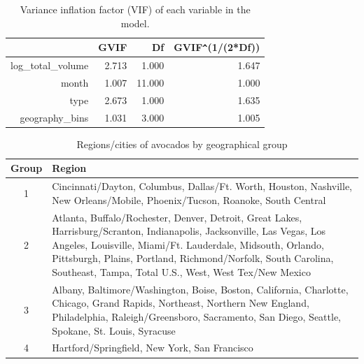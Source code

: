 \documentclass[11pt]{article}\usepackage[]{graphicx}\usepackage[]{color}
\begin{document}
\begin{center}
\begin{table}[ht]
\centering
\begin{tabular}{rrrr}
  \hline
 & GVIF & Df & GVIF\verb|^|(1/(2*Df)) \\ 
  \hline
log\_total\_volume & 2.713 & 1.000 & 1.647 \\ 
  month & 1.007 & 11.000 & 1.000 \\ 
  type & 2.673 & 1.000 & 1.635 \\ 
  geography\_bins & 1.031 & 3.000 & 1.005 \\ 
   \hline
\end{tabular}
\caption{Variance inflation factor (VIF) of each variable in the model.} 
\label{vif_table}
\end{table}

\end{center} 
\hfill \break


\begin{center}
\begin{table}[ht]
\centering
\begin{tabular}{cp{5in}}
  \hline
Group & Region \\ 
  \hline
1 & Cincinnati/Dayton, Columbus, Dallas/Ft. Worth, Houston, Nashville, New Orleans/Mobile, Phoenix/Tucson, Roanoke, South Central \\ 
  2 & Atlanta, Buffalo/Rochester, Denver, Detroit, Great Lakes, Harrisburg/Scranton, Indianapolis, Jacksonville, Las Vegas, Los Angeles, Louisville, Miami/Ft. Lauderdale, Midsouth, Orlando, Pittsburgh, Plains, Portland, Richmond/Norfolk, South Carolina, Southeast, Tampa, Total U.S., West, West Tex/New Mexico \\ 
  3 & Albany, Baltimore/Washington, Boise, Boston, California, Charlotte, Chicago, Grand Rapids, Northeast, Northern New England, Philadelphia, Raleigh/Greensboro, Sacramento, San Diego, Seattle, Spokane, St. Louis, Syracuse \\ 
  4 & Hartford/Springfield, New York, San Francisco \\ 
   \hline
\end{tabular}
\caption{Regions/cities of avocados by geographical group} 
\label{region}
\end{table}

\end{center} 
\end{document}

